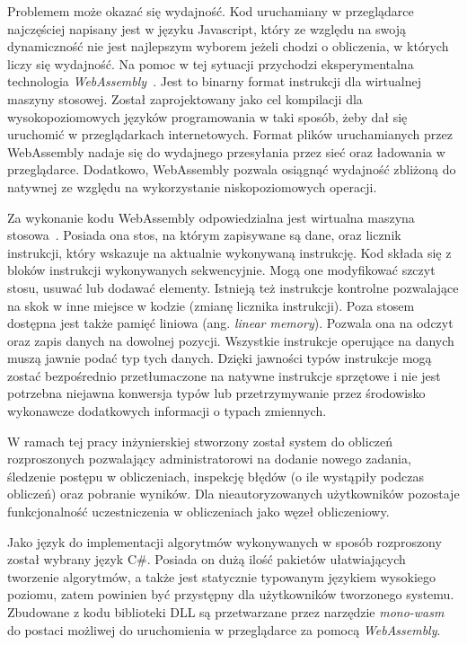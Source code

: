 \documentclass[a4paper,11pt,twoside]{report}
\theoremstyle{definition}
\begin{document}
    Problemem może okazać się wydajność. Kod uruchamiany w przeglądarce najczęściej napisany
    jest w języku {Javascript}, który ze względu na swoją dynamiczność nie jest najlepszym wyborem
    jeżeli chodzi o obliczenia, w których liczy się wydajność. Na pomoc w tej sytuacji przychodzi
    eksperymentalna technologia \textit{WebAssembly}~\cite{webassembly-goals}.
    Jest to binarny format instrukcji dla wirtualnej maszyny stosowej.
    Został zaprojektowany jako cel kompilacji dla wysokopoziomowych języków programowania
    w taki sposób, żeby dał się uruchomić w przeglądarkach internetowych.
    Format plików uruchamianych przez WebAssembly nadaje się do wydajnego przesyłania przez sieć
    oraz ładowania w przeglądarce.
    Dodatkowo, WebAssembly pozwala osiągnąć wydajność zbliżoną do natywnej ze względu na wykorzystanie
    niskopoziomowych operacji.
    
    Za wykonanie kodu WebAssembly odpowiedzialna jest wirtualna maszyna stosowa~\cite{webassembly-semantics}.
    Posiada ona stos, na którym zapisywane są dane, oraz licznik instrukcji, który wskazuje
    na aktualnie wykonywaną instrukcję.
    Kod składa się z bloków instrukcji wykonywanych sekwencyjnie.
    Mogą one modyfikować szczyt stosu, usuwać lub dodawać elementy.
    Istnieją też instrukcje kontrolne pozwalające na skok w inne miejsce w kodzie (zmianę licznika instrukcji).
    Poza stosem dostępna jest także pamięć liniowa (ang. \textit{linear memory}).
    Pozwala ona na odczyt oraz zapis danych na dowolnej pozycji.
    Wszystkie instrukcje operujące na danych muszą jawnie podać typ tych danych.
    Dzięki jawności typów instrukcje mogą zostać bezpośrednio przetłumaczone na natywne instrukcje
    sprzętowe
    i nie jest potrzebna niejawna konwersja typów lub przetrzymywanie przez środowisko wykonawcze
    dodatkowych informacji o typach zmiennych.
    
    W ramach tej pracy inżynierskiej stworzony został system do obliczeń rozproszonych pozwalający
    administratorowi na dodanie nowego zadania, śledzenie postępu w obliczeniach, inspekcję
    błędów (o ile wystąpiły podczas obliczeń) oraz pobranie wyników.
    Dla nieautoryzowanych użytkowników pozostaje funkcjonalność uczestniczenia w obliczeniach jako węzeł obliczeniowy.

    Jako język do implementacji algorytmów wykonywanych w sposób rozproszony został wybrany język C\#.
    Posiada on dużą ilość pakietów ułatwiających tworzenie algorytmów,
    a także jest statycznie typowanym językiem wysokiego poziomu,
    zatem powinien być przystępny dla użytkowników tworzonego systemu.
    Zbudowane z kodu biblioteki DLL są przetwarzane przez narzędzie \textit{mono-wasm}
    do postaci możliwej do uruchomienia w przeglądarce za pomocą \textit{WebAssembly}.
    
\end{document}
